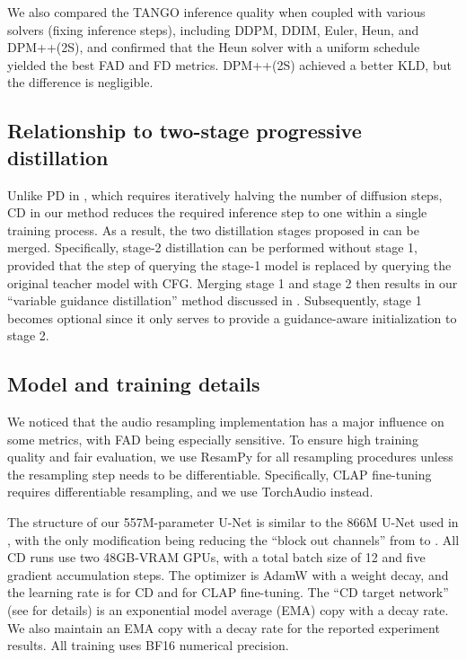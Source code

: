 \documentclass{article}
\begin{document}
We also compared the TANGO inference quality when coupled with various solvers (fixing  inference steps), including DDPM, DDIM, Euler, Heun, and DPM++(2S), and confirmed that the Heun solver with a uniform schedule yielded the best FAD and FD metrics. DPM++(2S) achieved a better KLD, but the difference is negligible.


\subsection{Relationship to two-stage progressive distillation} \label{sec:twostage_details}

Unlike PD in \cite{distillcfg}, which requires iteratively halving the number of diffusion steps, CD in our method reduces the required inference step to one within a single training process. As a result, the two distillation stages proposed in \cite{distillcfg} can be merged. Specifically, stage-2 distillation can be performed without stage 1, provided that the step of querying the stage-1 model is replaced by querying the original teacher model with CFG. Merging stage 1 and stage 2 then results in our ``variable guidance distillation'' method discussed in . Subsequently, stage 1 becomes optional since it only serves to provide a guidance-aware initialization to stage 2.


\subsection{Model and training details} \label{sec:model_details}

We noticed that the audio resampling implementation has a major influence on some metrics, with FAD being especially sensitive. To ensure high training quality and fair evaluation, we use ResamPy \cite{resampy} for all resampling procedures unless the resampling step needs to be differentiable. Specifically, CLAP fine-tuning requires differentiable resampling, and we use TorchAudio \cite{torchaudio} instead.

The structure of our 557M-parameter U-Net is similar to the 866M U-Net used in \cite{tango}, with the only modification being reducing the ``block out channels'' from  to . All CD runs use two 48GB-VRAM GPUs, with a total batch size of 12 and five gradient accumulation steps. The optimizer is AdamW with a  weight decay, and the learning rate is  for CD and  for CLAP fine-tuning. The ``CD target network'' (see \cite{cm} for details) is an exponential model average (EMA) copy with a  decay rate. We also maintain an EMA copy with a  decay rate for the reported experiment results. All training uses BF16 numerical precision.
\end{document}
